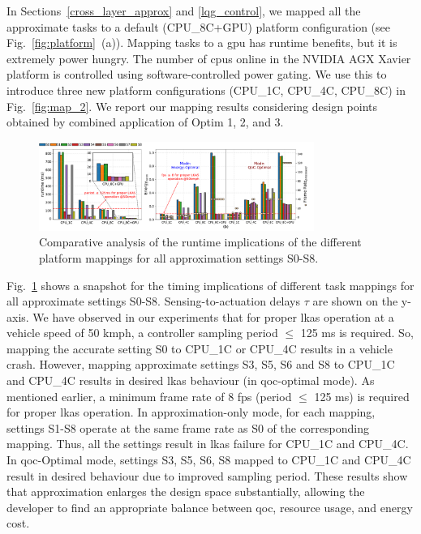 In Sections~\ref{cross_layer_approx} and \ref{lqg_control}, we mapped all the approximate tasks to a default (CPU\_8C+GPU) platform configuration (see Fig.~\ref{fig:platform}~(a)). Mapping tasks to a \gls{gpu} has runtime benefits, but it is extremely power hungry. 
The number of \glspl{cpu} online in the NVIDIA AGX Xavier platform is controlled using software-controlled power gating. We use this to introduce three new platform configurations (CPU\_1C, CPU\_4C, CPU\_8C) in Fig.~\ref{fig:map_2}. 
We report our mapping results considering design points obtained by combined application of Optim 1, 2, and 3.
\begin{figure}[h!]
    \centering
		\includegraphics[width=0.8\textwidth]{figs/qoc_map_runtime.pdf}
		\captionsetup{width=0.95\linewidth}
		\caption{{Comparative analysis of the runtime implications of the different platform mappings for all approximation settings S0-S8.}}
		\label{fig:map_1}
\end{figure}
\par Fig.~\ref{fig:map_1} shows a snapshot for the timing implications of different task mappings for all approximate settings S0-S8. Sensing-to-actuation delays $\tau$ are shown on the y-axis. We have observed in our experiments that for proper \gls{lkas} operation at a vehicle speed of 50 kmph, a controller sampling period $\leq$ 125 ms is required. So, mapping the accurate setting S0 to CPU\_1C or CPU\_4C results in a vehicle crash. However, mapping approximate settings S3, S5, S6 and S8 to CPU\_1C and CPU\_4C results in desired \gls{lkas} behaviour (in \gls{qoc}-optimal mode). 
As mentioned earlier, a minimum frame rate of 8 fps (period $\leq$ 125 ms) is required for proper \gls{lkas} operation. In approximation-only mode, for each mapping, settings S1-S8 operate at the same frame rate as S0 of the corresponding mapping. Thus, all the settings result in \gls{lkas} failure for CPU\_1C and CPU\_4C. 
In \gls{qoc}-Optimal mode, settings S3, S5, S6, S8 mapped to CPU\_1C and CPU\_4C result in desired behaviour due to improved sampling period. 
These results show that approximation enlarges the design space substantially, allowing the developer to find an appropriate balance between \gls{qoc}, resource usage, and energy cost.